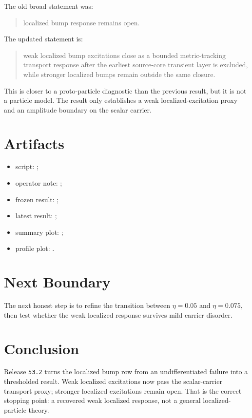 \documentclass[11pt]{article}
\begin{document}
The old broad statement was:
\begin{quote}
localized bump response remains open.
\end{quote}

The updated statement is:
\begin{quote}
weak localized bump excitations close as a bounded metric-tracking transport response after the earliest source-core transient layer is excluded, while stronger localized bumps remain outside the same closure.
\end{quote}

This is closer to a proto-particle diagnostic than the previous result, but it is not a particle model. The result only establishes a weak localized-excitation proxy and an amplitude boundary on the scalar carrier.

\section{Artifacts}

\begin{itemize}
\item script: ;
\item operator note: ;
\item frozen result: ;
\item latest result: ;
\item summary plot: ;
\item profile plot: .
\end{itemize}

\section{Next Boundary}

The next honest step is to refine the transition between \(\eta = 0.05\) and \(\eta = 0.075\), then test whether the weak localized response survives mild carrier disorder.

\section{Conclusion}

Release \texttt{53.2} turns the localized bump row from an undifferentiated failure into a thresholded result. Weak localized excitations now pass the scalar-carrier transport proxy; stronger localized excitations remain open. That is the correct stopping point: a recovered weak localized response, not a general localized-particle theory.
\end{document}
